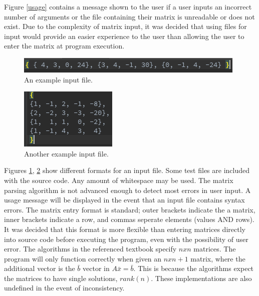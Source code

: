 \documentclass[12pt]{article}
\begin{document}
Figure \ref{usage} contains a message shown to the user if a user inputs an incorrect
number of arguments or the file containing their matrix is unreadable or does not 
exist. Due to the complexity of matrix input, it was decided that using files for 
input would provide an easier experience to the user than allowing the user to 
enter the matrix at program execution.

\begin{figure}[H]
\begin{center}
\includegraphics{input1.png}
\caption{An example input file.}
\label{input1}
\end{center}
\end{figure}
\begin{figure}[H]
\begin{center}
\includegraphics{input2.png}
\caption{Another example input file.}
\label{input2}
\end{center}
\end{figure}

Figures \ref{input1}, \ref{input2} show different formats for an input file. Some
test files are included with the source code. Any amount of whitespace may be used.
The matrix parsing algorithm is not advanced enough to detect most errors in user
input. A usage message will be displayed in the event that an input file contains
syntax errors. The matrix entry format is standard; outer brackets indicate the 
a matrix, inner brackets indicate a row, and commas seperate elements 
(values AND rows). It was decided that this format is more flexible than entering
matrices directly into source code before executing the program, even with the
possibility of user error. The algorithms in the referenced textbook specify $n x n$ 
matrices\cite{numerical}. The program will only function correctly when given an $n x n + 1$ 
matrix, where the additional vector is the $\bar{b}$ vector in $A\bar{x} = \bar{b}$\cite{numerical}.
This is because the algorithms expect the matrices to have single solutions,
$rank(n)$.
These implementations are also undefined in the event of inconsistency.
\end{document}
